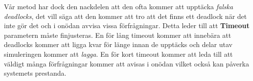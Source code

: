 Vår metod har dock den nackdelen att den ofta kommer att upptäcka \emph{falska deadlocks}, det vill säga att den kommer att tro att det finns ett deadlock när det inte gör det och i onödan avvisa vissa förfrågningar. Detta leder till att \textbf{Timeout} parametern måste finjusteras. En för lång timeout kommer att innebära att deadlocks kommer att ligga kvar för länge innan de upptäcks och delar utav simuleringen kommer att  \emph{lagga}. En för kort timeout kommer att leda till att väldigt många förfrågningar kommer att avisas i onödan vilket också kan påverka systemets prestanda.
























